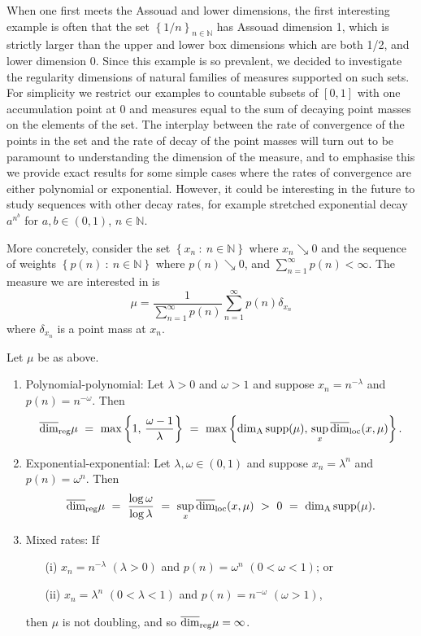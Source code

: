 When one first meets the Assouad and lower dimensions, the first interesting example is often that the set $\left\{1/n \right\}_{n\in \mathbb{N}}$ has Assouad dimension 1, which is strictly larger than the upper and lower box dimensions which are both 1/2, and lower dimension 0. Since this example is so prevalent, we decided to investigate the regularity dimensions of natural families of measures supported on such sets. For simplicity we restrict our examples to countable subsets of $[0,1]$ with one accumulation point at 0 and measures equal to the sum of decaying point masses on the elements of the set. The interplay between the rate of convergence of the points in the set and the rate of decay of the point masses will turn out to be paramount to understanding the dimension of the measure, and to emphasise this we provide exact results for some simple cases where the rates of convergence are either polynomial or exponential.  However, it could be interesting in the future to study  sequences with other decay rates, for example  stretched exponential decay $a^{n^b}$ for $a,b \in (0,1)$, $n \in \mathbb{N}$.

More concretely, consider the set $\left\{ x_n \ : \ n \in \mathbb{N}\right\}$ where  $x_n  \searrow 0$ and the sequence of weights $\left\{ p(n) \ : \ n \in \mathbb{N} \right\}$ where $p(n) \searrow 0$, and $\sum_{n=1}^\infty p(n) < \infty$.  The measure we are interested in is
\[
\mu = \frac{1}{\sum_{n=1}^\infty p(n) } \sum_{n=1}^\infty p(n)\delta_{x_n} 
\]
where $\delta_{x_n} $ is a point mass at $x_n$.

\begin{theorem}\label{ch-upper-reg:sequences}
	Let $\mu$ be as above.
	\begin{enumerate}
		\item Polynomial-polynomial: Let $\lambda > 0$ and $\omega > 1$ and suppose $x_n = n^{-\lambda}$ and $p(n)=n^{-\omega}$.  Then
		\[
		\overline{\dim}_{\textup{reg}} \mu \ = \  \max \left\{1, \, \frac{\omega-1}{\lambda}\right\} \  =\  \max \left\{ \dim_{\textup{A}} \textup{supp} (\mu), \, \sup_x \overline{\dim}_{\textrm{loc}}(x,\mu)\right\}.
		\]
		\item Exponential-exponential: Let $\lambda, \omega \in (0,1)$ and suppose $x_n= \lambda^{n}$ and $p(n)=\omega^{n}$.  Then
		\[
		\r \ = \  \frac{\log \omega}{\log \lambda}  \ = \ \sup_x \overline{\dim}_{\textup{loc}}(x,\mu) \ >  \     0 \ = \ \Assouad \textup{supp} (\mu) .
		\]
		\item Mixed rates: If
		\begin{enumerate}
			\item[(i)] $x_n = n^{-\lambda}$ $(\lambda >0)$ and $p(n)=\omega^{n}$ $(0< \omega < 1)$; or
			\item[(ii)]  $x_n =  \lambda^{n}$ $(0< \lambda < 1)$ and $p(n)=n^{-\omega}$ $(\omega >1)$,
		\end{enumerate}
		then $\mu$ is not doubling, and so  $\overline{\dim}_{\textup{reg}} \mu = \infty$.
	\end{enumerate}
\end{theorem}


